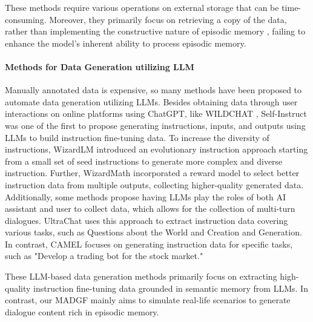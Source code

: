 These methods require various operations on external storage that can be time-consuming. Moreover, they primarily focus on retrieving a copy of the data, rather than implementing the constructive nature of episodic memory \cite{sprott1933remembering,schacter2012constructive}, failing to enhance the model's inherent ability to process episodic memory.



\paragraph{Methods for Data Generation utilizing LLM}
Manually annotated data is expensive, so many methods \cite{xu2023wizardlm,luo2023wizardmath,zhao2024wildchat,wang2022self,ding2023enhancing,li2023camel} have been proposed to automate data generation utilizing LLMs. Besides obtaining data through user interactions on online platforms using ChatGPT, like WILDCHAT \cite{zhao2024wildchat}, Self-Instruct \cite{wang2022self} was one of the first to propose generating instructions, inputs, and outputs using LLMs to build instruction fine-tuning data. To increase the diversity of instructions, WizardLM \cite{xu2023wizardlm} introduced an evolutionary instruction approach starting from a small set of seed instructions to generate more complex and diverse instruction. Further, WizardMath \cite{luo2023wizardmath} incorporated a reward model to select better instruction data from multiple outputs, collecting higher-quality generated data. Additionally, some methods \cite{ding2023enhancing,li2023camel} propose having LLMs play the roles of both AI assistant and user to collect data, which allows for the collection of multi-turn dialogues. UltraChat \cite{ding2023enhancing} uses this approach to extract instruction data covering various tasks, such as Questions about the World and Creation and Generation. In contrast, CAMEL \cite{li2023camel} focuses on generating instruction data for specific tasks, such as "Develop a trading bot for the stock market."

These LLM-based data generation methods primarily focus on extracting high-quality instruction fine-tuning data grounded in semantic memory from LLMs. In contrast, our MADGF mainly aims to simulate real-life scenarios to generate dialogue content rich in episodic memory.

